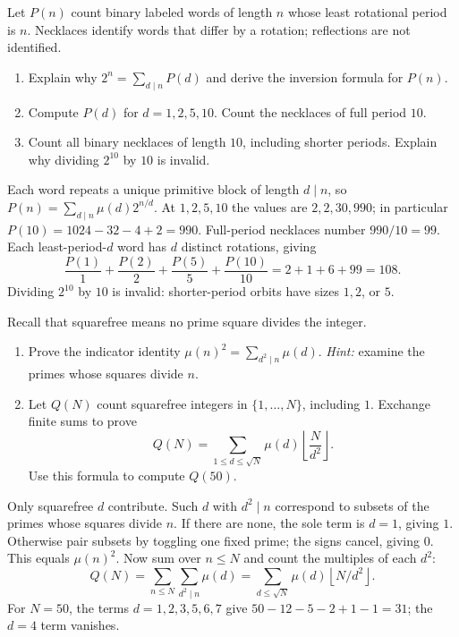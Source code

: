 \studentbreak
{}

Let $P(n)$ count binary labeled words of length $n$ whose least rotational period is $n$.
Necklaces identify words that differ by a rotation; reflections are not identified.
\begin{enumerate}
 \item Explain why $2^n=\sum_{d\mid n}P(d)$ and derive the inversion
 formula for $P(n)$. 
 \item Compute $P(d)$ for $d=1,2,5,10$. Count the necklaces of full
 period $10$. 
 \item Count all binary necklaces of length $10$, including shorter
 periods. Explain why dividing $2^{10}$ by $10$ is invalid. 
\end{enumerate}
\begin{solution}
Each word repeats a unique primitive block of length $d\mid n$, so
$P(n)=\sum_{d\mid n}\mu(d)2^{n/d}$.
At $1,2,5,10$ the values are $2,2,30,990$; in particular
$P(10)=1024-32-4+2=990$. Full-period necklaces number $990/10=99$.
Each least-period-$d$ word has $d$ distinct rotations, giving
\[
 \frac{P(1)}1+\frac{P(2)}2+\frac{P(5)}5+\frac{P(10)}{10}
 =2+1+6+99=108.
\]
Dividing $2^{10}$ by $10$ is invalid: shorter-period orbits have sizes $1,2$, or $5$.
\end{solution}

Recall that squarefree means no prime square divides the integer.
\begin{enumerate}
 \item Prove the indicator identity
 $\mu(n)^2=\sum_{d^2\mid n}\mu(d)$.
 \emph{Hint:} examine the primes whose squares divide $n$. 
 \item Let $Q(N)$ count squarefree integers in $\{1,\ldots,N\}$,
 including $1$. Exchange finite sums to prove
 \[
 Q(N)=\sum_{1\le d\le\sqrt N}\mu(d)\left\lfloor\frac{N}{d^2}\right\rfloor.
 \]
 Use this formula to compute $Q(50)$. 
\end{enumerate}
\begin{solution}
Only squarefree $d$ contribute. Such $d$ with $d^2\mid n$ correspond
to subsets of the primes whose squares divide $n$. If there are none,
the sole term is $d=1$, giving $1$. Otherwise pair subsets by toggling
one fixed prime; the signs cancel, giving $0$. This equals $\mu(n)^2$.
Now sum over $n\le N$ and count the multiples of each $d^2$:
\[
 Q(N)=\sum_{n\le N}\sum_{d^2\mid n}\mu(d)
 =\sum_{d\le\sqrt N}\mu(d)\left\lfloor N/d^2\right\rfloor.
\]
For $N=50$, the terms $d=1,2,3,5,6,7$ give
$50-12-5-2+1-1=31$; the $d=4$ term vanishes.
\end{solution}

